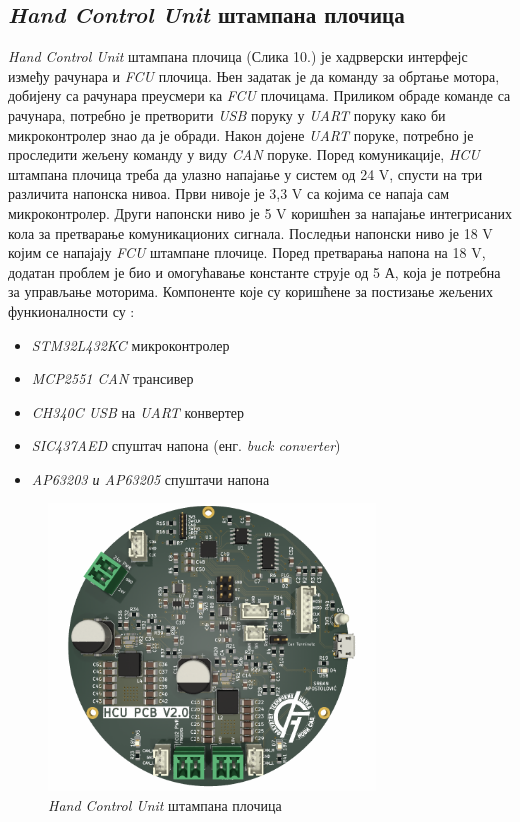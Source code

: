 \documentclass{article}
\begin{document}
\subsection{\textit{Hand Control Unit} штампана плочица} 
\textit{Hand Control Unit} штампана плочица (Слика 10.) је хадрверски интерфејс између рачунара и \textit{FCU} плочица. Њен задатак је да команду
за обртање мотора, добијену са рачунара преусмери ка \textit{FCU} плочицама. Приликом обраде команде са рачунара, потребно је претворити
\textit{USB} поруку у \textit{UART} поруку како би микроконтролер знао да је обради. Након дојене \textit{UART} поруке, потребно је 
проследити жељену команду у виду \textit{CAN} поруке. Поред комуникације, \textit{HCU} штампана плочица треба да улазно напајање у систем 
од 24 V, спусти на три различита напонска нивоа. Први нивоје је 3,3 V са којима се напаја сам микроконтролер. Други напонски ниво је 
5 V коришћен за напајање интегрисаних кола за претварање комуникационих сигнала. Последњи напонски ниво је 18 V којим се напајају \textit{FCU}
штампане плочице. Поред претварања напона на 18 V, додатан проблем је био и омогућавање константе струје од 5 А, која је потребна за управљање 
моторима. Компоненте које су коришћене за постизање жељених функионалности су : \\
\begin{itemize}
    \item \textit{STM32L432KC} микроконтролер \cite{stm32_l4_data} \cite{stm32_l4_ref} \cite{stm32_l4_prog}
    \item \textit{MCP2551 CAN} трансивер  \cite{mcp2551}
    \item \textit{CH340C USB} на \textit{UART} конвертер \cite{ch340c}
    \item \textit{SIC437AED} спуштач напона (енг. \textit{buck converter}) \cite{vishay}
    \item \textit{AP63203 и AP63205} спуштачи напона \cite{ap6320}
\end{itemize}

\begin{figure}[H]
\centering
\includegraphics[height=3in]{Images/HCU.png}
\caption{\textit{Hand Control Unit} штампана плочица}
\label{fig:figure8}
\end{figure}
\end{document}
